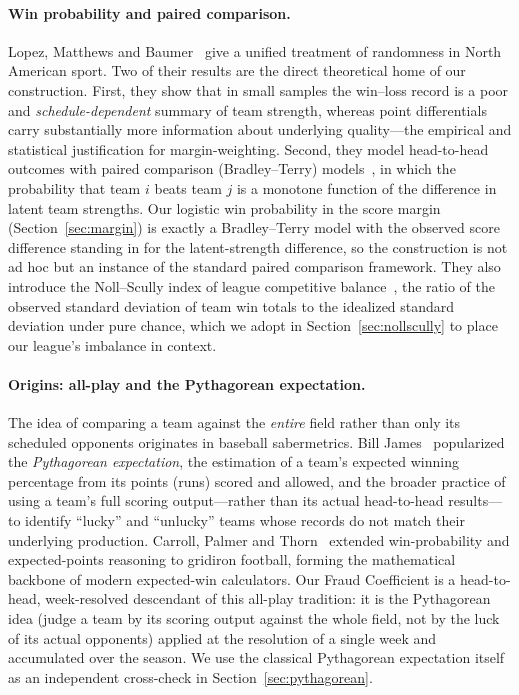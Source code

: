 \documentclass[11pt]{article}
\begin{document}
\paragraph{Win probability and paired comparison.}
Lopez, Matthews and Baumer~\cite{lopez2018} give a unified treatment of
randomness in North American sport. Two of their results are the direct
theoretical home of our construction. First, they show that in small samples
the win--loss record is a poor and \emph{schedule-dependent} summary of team
strength, whereas point differentials carry substantially more information
about underlying quality---the empirical and statistical justification for
margin-weighting. Second, they model head-to-head outcomes with paired
comparison (Bradley--Terry) models~\cite{bradley1952}, in which the
probability that team $i$ beats team $j$ is a monotone function of the
difference in latent team strengths. Our logistic win probability in the score
margin (Section~\ref{sec:margin}) is exactly a Bradley--Terry model with the
observed score difference standing in for the latent-strength difference, so
the construction is not ad hoc but an instance of the standard paired
comparison framework. They also introduce the Noll--Scully index of league
competitive balance~\cite{noll1988,scully1989}, the ratio of the observed
standard deviation of team win totals to the idealized standard deviation
under pure chance, which we adopt in Section~\ref{sec:nollscully} to place our
league's imbalance in context.

\paragraph{Origins: all-play and the Pythagorean expectation.}
The idea of comparing a team against the \emph{entire} field rather than only
its scheduled opponents originates in baseball sabermetrics. Bill
James~\cite{james1980s} popularized the \emph{Pythagorean expectation}, the
estimation of a team's expected winning percentage from its points (runs)
scored and allowed, and the broader practice of using a team's full scoring
output---rather than its actual head-to-head results---to identify ``lucky''
and ``unlucky'' teams whose records do not match their underlying production.
Carroll, Palmer and Thorn~\cite{carroll1988} extended win-probability and
expected-points reasoning to gridiron football, forming the mathematical
backbone of modern expected-win calculators. Our Fraud Coefficient is a
head-to-head, week-resolved descendant of this all-play tradition: it is the
Pythagorean idea (judge a team by its scoring output against the whole field,
not by the luck of its actual opponents) applied at the resolution of a single
week and accumulated over the season. We use the classical Pythagorean
expectation itself as an independent cross-check in
Section~\ref{sec:pythagorean}.
\end{document}
